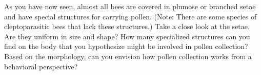 \documentclass[letterpaper, 11pt]{article}
\begin{document}
\noindent{}As you have now seen, almost all bees are covered in plumose or branched setae and have special structures for carrying pollen. (Note: There are some species of cleptoparasitic bees that lack these structures.) Take a close look at the setae. Are they uniform in size and shape? How many specialized structures can you find on the body that you hypothesize might be involved in pollen collection? Based on the morphology, can you envision how pollen collection works from a behavioral perspective?

\FloatBarrier


\end{document}
